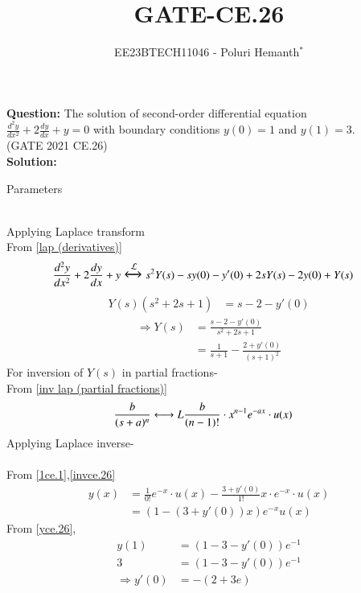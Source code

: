\documentclass[journal,12pt,twocolumn]{IEEEtran}
\theoremstyle{remark}
\begin{document}

\vspace{3cm}

\title{GATE-CE.26}
\author{EE23BTECH11046 - Poluri Hemanth$^{*}$}
\maketitle
\textbf{Question:}
The solution of second-order differential equation \\ $\frac{d^2y}{dx^2}+2\frac{dy}{dx}+y=0$ with boundary conditions $y(0)=1$ and $y(1)=3$.\\
\hfill{(GATE  2021 CE.26)}\\
\textbf{Solution:}
\fi
\begin{table}[h!]
        
        \caption{Parameters}
\end{table}\\
Applying Laplace transform
\\From \ref{lap (derivatives)}
\begin{align}
	\frac{d^2y}{dx^2}+2\frac{dy}{dx}+y&\Large\xleftrightarrow{\mathcal{L}}s^2Y(s)-sy(0)-y'(0)+2sY(s)-2y(0)+Y(s)
\end{align}
\begin{align}
	Y(s)(s^2+2s+1)&=s-2-y'(0)
\end{align}
\begin{align}
	\Rightarrow Y(s)&=\frac{s-2-y'(0)}{s^2+2s+1}\\
	&=\frac{1}{s+1}-\frac{2+y'(0)}{(s+1)^2}\label{1ce.1}
\end{align}
For inversion of $Y(s)$ in partial fractions-
\\From \ref{inv lap (partial fractions)}
\begin{align}
	&\frac{b}{(s+a)^n}\system{L}\frac{b}{(n-1)!}\cdot x^{n-1} e^{-ax}\cdot u(x)\label{invce.26}
\end{align}
Applying Laplace inverse-\\
\\From \eqref{1ce.1},\eqref{invce.26}
\begin{align}
	y(x)&=\frac{1}{0!} e^{-x}\cdot u(x)-\frac{3+y'(0)}{1!}x\cdot e^{-x}\cdot u(x)\\
	&=(1-(3+y'(0))x)e^{-x}u(x)\label{yce.26}
\end{align}
From \eqref{yce.26},
\begin{align}
	y(1)&=(1-3-y'(0))e^{-1}\\
	3&=(1-3-y'(0))e^{-1}\\
	\Rightarrow y'(0)&=-(2+3e)\label{y'0ce.26}
\end{align}
\end{document}
